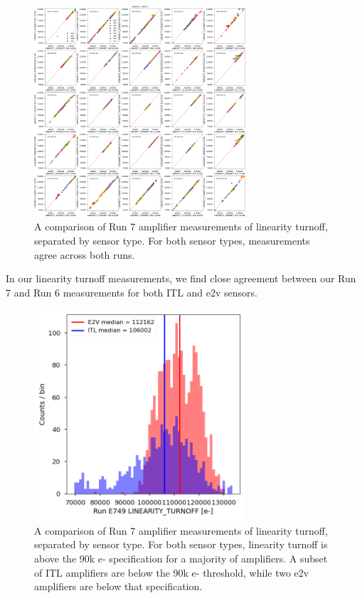 \begin{figure}[ht]
\begin{centering}
\includegraphics[width=0.7\textwidth]{figures/baselineCharacterization/13591_E749_LINEARITY_TURNOFF.png}
\caption{A comparison of Run 7 amplifier measurements of linearity turnoff, separated by sensor type. For both sensor types, measurements agree across both runs.}
\end{centering}
\end{figure}

In our linearity turnoff measurements, we find close agreement between
our Run 7 and Run 6 measurements for both ITL and e2v sensors.

\begin{figure}[ht]
\begin{centering}
\includegraphics[width=0.7\textwidth]{figures/baselineCharacterization/LINEARITY_TURNOFF_E749_sensorType.png}
\caption{A comparison of Run 7 amplifier measurements of linearity turnoff, separated by sensor type. For both sensor types, linearity turnoff is above the 90k e- specification for a majority of amplifiers. A subset of ITL amplifiers are below the 90k e- threshold, while two e2v amplifiers are below that specification.}
\end{centering}
\end{figure}

